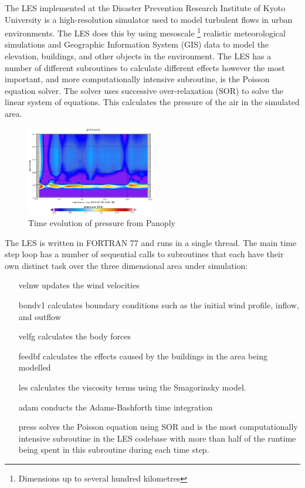 The LES implemented at the Disaster Prevention Research Institute of Kyoto
University is a high-resolution simulator used to model turbulent flows in urban
environments. The LES does this by using mesoscale \footnote{Dimensions up to
several hundred kilometres} realistic meteorological simulations and Geographic
Information System (GIS) data to model the elevation, buildings, and other
objects in the environment. The LES has a number of different subroutines to
calculate different effects however the most important, and more computationally
intensive subroutine, is the Poisson equation solver. The solver uses successive
over-relaxation (SOR) to solve the linear system of equations. This calculates
the pressure of the air in the simulated area.

\begin{figure}
    \includegraphics[width=0.5\textwidth]{graphs/pressure_in_LES_output_p.png}
    \caption{Time evolution of pressure from Panoply}
    \label{fig:lespressure}
\end{figure}

The LES is written in FORTRAN 77 and runs in a single thread. The main time step
loop has a number of sequential calls to subroutines that each have their own
distinct task over the three dimensional area under simulation:

\begin{itemize}

    \item[velnw] updates the wind velocities

    \item[bondv1] calculates boundary conditions such as the initial wind
    profile, inflow, and outflow

    \item[velfg] calculates the body forces

    \item[feedbf] calculates the effects caused by the buildings in the area
    being modelled

    \item[les] calculates the viscosity terms using the Smagorinsky model.

    \item[adam] conducts the Adams-Bashforth time integration

    \item[press] solves the Poisson equation using SOR and is the most
    computationally intensive subroutine in the LES codebase with more than half
    of the runtime being spent in this subroutine during each time step.

\end{itemize}

